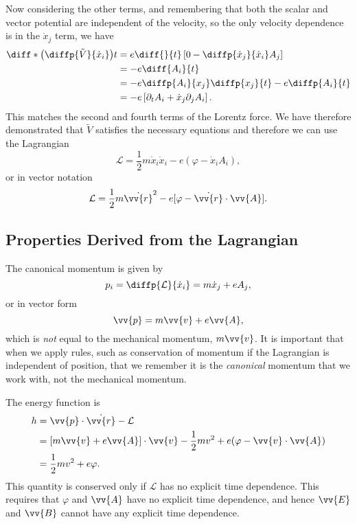 \documentclass[fleqn]{NotesClass}
\newcommand*{\lagrangian}{\mathcal{L}}
\begin{document}
    Now considering the other terms, and remembering that both the scalar and vector potential are independent of the velocity, so the only velocity dependence is in the \(\dot{x}_j\) term, we have
    \begin{align}
        \diff*{\left( \diffp{\tilde{V}}{\dot{x}_i} \right)}{t} &= e\diff{}{t}\left[ 0 - \diffp{\dot{x}_j}{\dot{x}_i}A_j \right]\\
        &= -e\diff{A_i}{t}\\
        &= -e\diffp{A_i}{x_j}\diffp{x_j}{t} - e\diffp{A_i}{t}\\
        &= -e\left[ \partial_tA_i + \dot{x}_j\partial_j A_i \right].
    \end{align}
    This matches the second and fourth terms of the Lorentz force.
    We have therefore demonstrated that \(\tilde{V}\) satisfies the necessary equations and therefore we can use the Lagrangian
    \begin{equation}
        \lagrangian = \frac{1}{2}m\dot{x}_i\dot{x}_i - e\left( \varphi - \dot{x}_iA_i \right),
    \end{equation}
    or in vector notation
    \begin{equation}
        \lagrangian = \frac{1}{2}m \dot{\vv{r}}^2 - e[\varphi - \dot{\vv{r}} \cdot \vv{A}].
    \end{equation}
    
    \subsection{Properties Derived from the Lagrangian}
    The canonical momentum is given by
    \begin{equation}
        p_i = \diffp{\lagrangian}{\dot{x}_i} = m\dot{x}_j + eA_j,
    \end{equation}
    or in vector form
    \begin{equation}\label{eqn:canonical momentum EM}
        \vv{p} = m\vv{v} + e\vv{A},
    \end{equation}
    which is \emph{not} equal to the mechanical momentum, \(m\vv{v}\).
    It is important that when we apply rules, such as conservation of momentum if the Lagrangian is independent of position, that we remember it is the \emph{canonical} momentum that we work with, not the mechanical momentum.
    
    The energy function is
    \begin{align}
        h &= \vv{p}\cdot\dot{\vv{r}} - \lagrangian\\
        &= [m\vv{v} + e\vv{A}] \cdot \vv{v} - \frac{1}{2}mv^2 + e(\varphi - \vv{v}\cdot\vv{A})\\
        &= \frac{1}{2}mv^2 + e\varphi.\label{eqn:energy function EM}
    \end{align}
    This quantity is conserved only if \(\lagrangian\) has no explicit time dependence.
    This requires that \(\varphi\) and \(\vv{A}\) have no explicit time dependence, and hence \(\vv{E}\) and \(\vv{B}\) cannot have any explicit time dependence.
    
\end{document}
